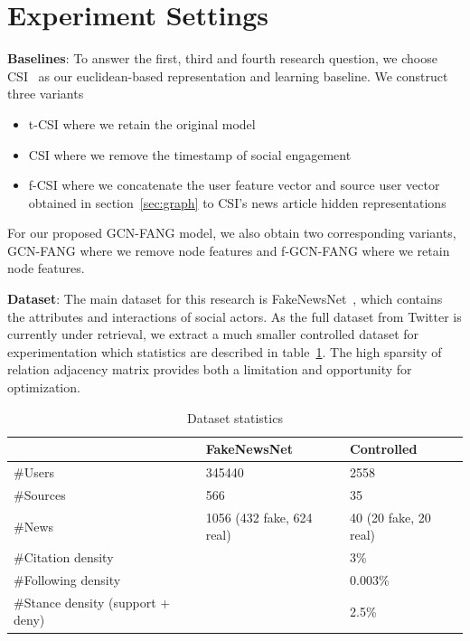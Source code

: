 \documentclass[fyp]{socreport}
\theoremstyle{definition}
\theoremstyle{hypothesis}
\begin{document}
\section{Experiment Settings}
\textbf{Baselines}: To answer the first, third and fourth research question, we choose CSI~\cite{ruchansky2017csi} as our euclidean-based representation and learning baseline. We construct three variants
\begin{itemize}
    \item t-CSI where we retain the original model
    \item CSI where we remove the timestamp of social engagement
    \item f-CSI where we concatenate the user feature vector and source user vector obtained in section~\ref{sec:graph} to CSI's news article hidden representations
\end{itemize}

For our proposed GCN-FANG model, we also obtain two corresponding variants, GCN-FANG where we remove node features and f-GCN-FANG where we retain node features.

\textbf{Dataset}: The main dataset for this research is FakeNewsNet~\cite{shu2018fakenewsnet}, which contains the attributes and interactions of social actors. As the full dataset from Twitter is currently under retrieval, we extract a much smaller controlled dataset for experimentation which statistics are described in table~\ref{table:statistics}. The high sparsity of relation adjacency matrix provides both a limitation and opportunity for optimization.

\begin{table}[t]
  \centering
  \tiny
  \begin{tabular}{|p{5cm}|p{5cm}|p{5cm}|}
  \hline
     & FakeNewsNet & Controlled \\ \hline \hline
    \#Users & 345440 & 2558 \\ \hline
    \#Sources & 566 & 35 \\ \hline
    \#News & 1056 (432 fake, 624 real) & 40 (20 fake, 20 real) \\ \hline
    \#Citation density & & 3\% \\ \hline
    \#Following density & & 0.003\% \\ \hline
    \#Stance density (support + deny) & & 2.5\% \\ \hline
  \end{tabular}
  \caption{Dataset statistics}
  \label{table:statistics}
\end{table}
\end{document}
